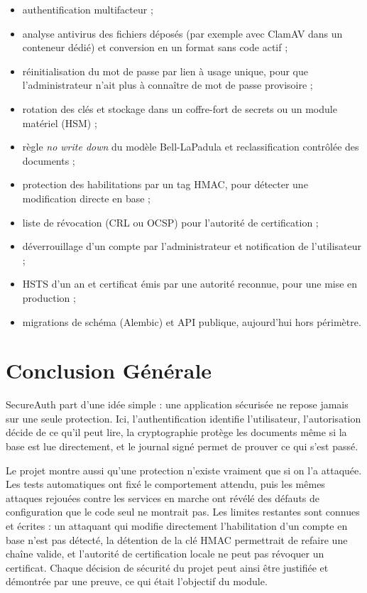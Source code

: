 \documentclass[12pt,a4paper]{report}
\begin{document}
\begin{itemize}
  \item authentification multifacteur ;
  \item analyse antivirus des fichiers déposés (par exemple avec ClamAV dans un conteneur dédié) et conversion en un format sans code actif ;
  \item réinitialisation du mot de passe par lien à usage unique, pour que l'administrateur n'ait plus à connaître de mot de passe provisoire ;
  \item rotation des clés et stockage dans un coffre-fort de secrets ou un module matériel (HSM) ;
  \item règle \emph{no write down} du modèle Bell-LaPadula et reclassification contrôlée des documents ;
  \item protection des habilitations par un tag HMAC, pour détecter une modification directe en base ;
  \item liste de révocation (CRL ou OCSP) pour l'autorité de certification ;
  \item déverrouillage d'un compte par l'administrateur et notification de l'utilisateur ;
  \item HSTS d'un an et certificat émis par une autorité reconnue, pour une mise en production ;
  \item migrations de schéma (Alembic) et API publique, aujourd'hui hors périmètre.
\end{itemize}

\section{Conclusion Générale}

SecureAuth part d'une idée simple : une application sécurisée ne repose jamais sur une seule protection. Ici, l'authentification identifie l'utilisateur, l'autorisation décide de ce qu'il peut lire, la cryptographie protège les documents même si la base est lue directement, et le journal signé permet de prouver ce qui s'est passé.

Le projet montre aussi qu'une protection n'existe vraiment que si on l'a attaquée. Les tests automatiques ont fixé le comportement attendu, puis les mêmes attaques rejouées contre les services en marche ont révélé des défauts de configuration que le code seul ne montrait pas. Les limites restantes sont connues et écrites : un attaquant qui modifie directement l'habilitation d'un compte en base n'est pas détecté, la détention de la clé HMAC permettrait de refaire une chaîne valide, et l'autorité de certification locale ne peut pas révoquer un certificat. Chaque décision de sécurité du projet peut ainsi être justifiée et démontrée par une preuve, ce qui était l'objectif du module.
\end{document}

